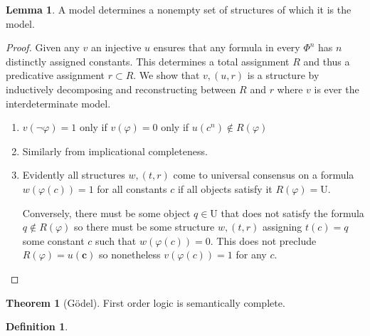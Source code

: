 \documentclass{amsbook}
\theoremstyle{definition}
\newtheorem{thm}{Theorem}[section]
\newtheorem{lmm}{Lemma}[section]
\newtheorem{dfn}{Definition}[section]
\begin{document}
\begin{lmm}
    A model determines a nonempty set of structures of which it is the model.
    \begin{proof}
        Given any $v$ an injective $u$ ensures that any formula in every $\Phi^n$ has $n$ distinctly assigned constants. This determines a total assignment $R$ and thus a predicative assignment $r \subset R$. We show that $v, (u, r)$ is a structure by inductively decomposing and reconstructing between $R$ and $r$ where $v$ is ever the interdeterminate model.
        \begin{enumerate}
            \item $v(\neg\varphi) = 1$ only if $v(\varphi) = 0$ only if $u(c^n) \notin R(\varphi)$
            \item Similarly from implicational completeness.
            \item Evidently all structures $w, (t, r)$ come to universal consensus on a formula $w(\varphi(c)) = 1$ for all constants $c$ if all objects satisfy it $R(\varphi) = \mathrm U$.

                  Conversely, there must be some object $q \in \mathrm U$ that does not satisfy the formula $q \notin R(\varphi)$ so there must be some structure $w, (t, r)$ assigning $t(c) = q$ some constant $c$ such that $w(\varphi(c)) = 0$. This does not preclude $R(\varphi) = u(\mathbf c)$ so nonetheless $v(\varphi(c)) = 1$ for any $c$.
        \end{enumerate}
    \end{proof}
\end{lmm}

\begin{thm}[G\"odel]
    First order logic is semantically complete.
\end{thm}

\begin{dfn}

\end{dfn}




\newpage
\end{document}
